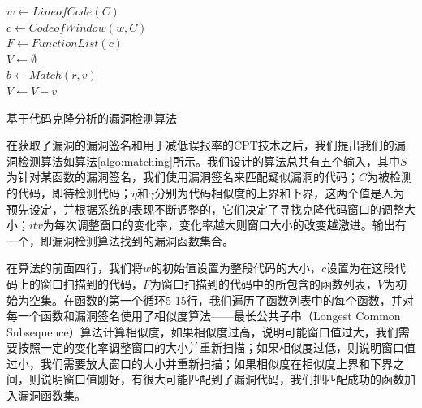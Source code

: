 \begin{algorithm}[htbp]
	\small
    $w \leftarrow LineofCode(C)$ \\
    $c \leftarrow CodeofWindow(w,C)$ \\
    $F \leftarrow FunctionList(c)$ \\
    $V \leftarrow \emptyset$ \\
     {
    }
     {
         {
            $b \leftarrow Match(r, v)$ \\
             {
                $V \leftarrow V - v$ \\
            }
        }
    }
	\caption{基于代码克隆分析的漏洞检测算法}\label{algo:matching}
\end{algorithm}


在获取了漏洞的漏洞签名和用于减低误报率的CPT技术之后，我们提出我们的漏洞检测算法如算法\ref{algo:matching}所示。我们设计的算法总共有五个输入，其中$S$为针对某函数的漏洞签名，我们使用漏洞签名来匹配疑似漏洞的代码；$C$为被检测的代码，即待检测代码；$\eta$和$\gamma$分别为代码相似度的上界和下界，这两个值是人为预先设定，并根据系统的表现不断调整的，它们决定了寻找克隆代码窗口的调整大小；$itv$为每次调整窗口的变化率，变化率越大则窗口大小的改变越激进。输出有一个，即漏洞检测算法找到的漏洞函数集合。

在算法的前面四行，我们将$w$的初始值设置为整段代码的大小，$c$设置为在这段代码上的窗口扫描到的代码，$F$为窗口扫描到的代码中的所包含的函数列表，$V$为初始为空集。在函数的第一个循环5-15行，我们遍历了函数列表中的每个函数，并对每一个函数和漏洞签名使用了相似度算法——最长公共子串（Longest Common Subsequence）算法计算相似度，如果相似度过高，说明可能窗口值过大，我们需要按照一定的变化率调整窗口的大小并重新扫描；如果相似度过低，则说明窗口值过小，我们需要放大窗口的大小并重新扫描；如果相似度在相似度上界和下界之间，则说明窗口值刚好，有很大可能匹配到了漏洞代码，我们把匹配成功的函数加入漏洞函数集。

